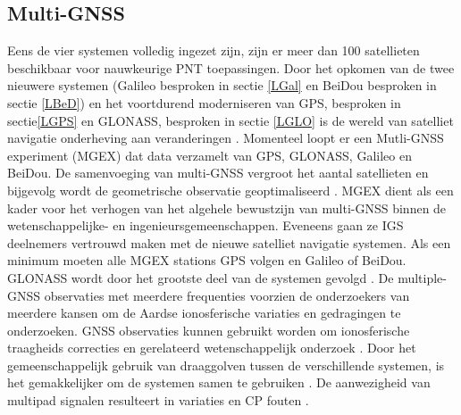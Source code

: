 \subsection{Multi-GNSS}
Eens de vier systemen volledig ingezet zijn, zijn er meer dan 100 satellieten beschikbaar voor nauwkeurige PNT toepassingen. Door het opkomen van de twee nieuwere systemen (Galileo besproken in sectie \ref{LGal} en BeiDou besproken in sectie \ref{LBeD}) en het voortdurend moderniseren van GPS, besproken in sectie\ref{LGPS} en GLONASS, besproken in sectie \ref{LGLO} is de wereld van satelliet navigatie onderheving aan veranderingen \cite{LBibGNSS4}. Momenteel loopt er een Mutli-GNSS experiment (MGEX) dat data verzamelt van GPS, GLONASS, Galileo en BeiDou. De samenvoeging van multi-GNSS vergroot het aantal satellieten en bijgevolg wordt de geometrische observatie geoptimaliseerd \cite{LBibGNSS5}. 
MGEX dient als een kader voor het verhogen van het algehele bewustzijn van multi-GNSS binnen de wetenschappelijke- en ingenieursgemeenschappen. Eveneens gaan ze IGS deelnemers vertrouwd maken met de nieuwe satelliet navigatie systemen. Als een minimum moeten alle MGEX stations GPS volgen en Galileo of BeiDou. GLONASS wordt door het grootste deel van de systemen gevolgd \cite{LBibGNSS9}.  De multiple-GNSS observaties met meerdere frequenties voorzien de onderzoekers van meerdere kansen om de Aardse ionosferische variaties en gedragingen te onderzoeken. GNSS observaties kunnen gebruikt worden om ionosferische traagheids correcties en gerelateerd wetenschappelijk onderzoek \cite{LBibBeiDou}. Door het gemeenschappelijk gebruik van draaggolven tussen de verschillende systemen, is het gemakkelijker om de systemen samen te gebruiken \cite{LBibPPP2}. De aanwezigheid van multipad signalen resulteert in variaties en CP fouten \cite{LBibGalileo3}. 

